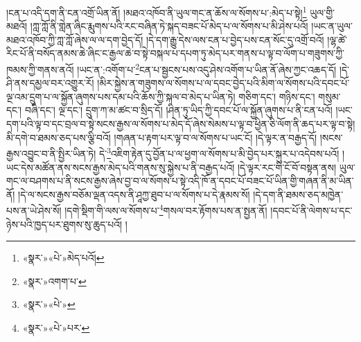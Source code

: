 །ངན་པ་འདི་དག་ནི་ངན་འགྲོ་ཡིན་ནོ། །མཐའ་འཁོབ་ནི་ཡུལ་གང་ན་ཆོས་ལ་སོགས་པ་:མེད་པ་སྟེ།\footnote{«སྣར་»«པེ་»མེད་པའོ།} ཡུལ་གྱི་མཐའོ། །ཀླ་ཀློ་ནི་གླེན་ཞིང་རྨུགས་པའི་རང་བཞིན་ཏེ་སྐད་བཟང་པོ་མེད་པ་ལ་སོགས་པ་མི་ཤེས་པའོ། །ཡང་ན་ཡུལ་མཐའ་འཁོབ་ཀྱི་ཀླ་ཀློ་ཞེས་ལ་ལ་དག་བྱེད་དོ། །དེ་དག་རྒྱུ་དེས་ལས་ངན་པ་བྱེད་པས་ངན་སོང་དུ་འགྲོ་བའོ། །ལྷ་ཚེ་རིང་པོ་ནི་བསོད་ནམས་ཆེ་ཞིང་ང་རྒྱལ་ཆེ་བ་སྟེ་བསྐལ་པ་དཔག་ཏུ་མེད་པར་གནས་པ་ལྟ་བ་ལོག་པ་གཟུགས་ཀྱི་ཁམས་ཀྱི་གནས་ནའོ། །ཡང་ན་:འགོག་པ་\footnote{«སྣར་»འགག་པ་}ངན་པ་སྦྱངས་པས་འདུ་ཤེས་འགོག་པ་ཡིན་ནོ་ཞེས་ཀྱང་འཆད་དོ། །དེ་ཤི་ནས་དམྱལ་བར་འགྱུར་རོ། །མིར་སྐྱེས་ན་གཟུགས་ལ་སོགས་པ་ལ་དབང་བྱེད་པའི་མིག་ལ་སོགས་པའི་དབང་པོ་ལྔ་འམ་དྲུག་པ་ལ་སྐྱོན་ཞུགས་པས་དམ་པའི་ཆོས་ཀྱི་སྐལ་བ་མེད་པ་ཡིན་ཏེ། གཅིག་དང་། གཉིས་དང་། གསུམ་དང་། བཞི་དང་། ལྔ་དང་། དྲུག་ཀ་མ་ཚང་བ་སྲིད་དོ། །ཤིན་ཏུ་ཡིད་ཀྱི་དབང་པོ་ལ་སྐྱོན་ཞུགས་པ་ནི་ངན་པའོ། །ཡང་དག་པའི་ལྟ་བ་དང་བྲལ་བ་སྟེ་སངས་རྒྱས་ལ་སོགས་པ་མེད་དོ་ཞེས་སེམས་པ་ལྟ་བ་ཕྱིན་ཅི་ལོག་ནི་ཆད་པར་ལྟ་བ་སྟེ། མི་དགེ་བ་ཐམས་ཅད་པས་ལྕི་བའོ། །གཞན་པ་རྟག་པར་ལྟ་བ་ལ་སོགས་པ་ཡང་ངོ། །དེ་ལྟར་ན་བརྒྱད་དོ། །སངས་རྒྱས་འབྱུང་བ་ནི་སྤྱིར་ཡིན་ཏེ། དེ་\footnote{«སྣར་»«པེ་»}འཇིག་རྟེན་དུ་བྱོན་པ་ལ་ཕྱག་ལ་སོགས་པ་མི་བྱེད་པར་སྐུར་པ་འདེབས་པའོ། །ཡང་དེས་མཚོན་ནས་སངས་རྒྱས་མེད་པའི་གནས་སུ་སྐྱེས་པ་ནི་བརྒྱད་པའོ། །དེ་ལྟར་རང་གི་ངོ་བོ་བསྟན་ནས། ཡུལ་གང་ལ་བཤགས་པ་ནི་སངས་རྒྱས་ཞེས་བྱ་བ་ལ་སོགས་པ་སྟེ་འདི་ཁོ་ན་དབང་པོ་བཟང་པོ་ཡིན་གྱི་གཞན་ནི་མ་ཡིན་ནོ། །དེ་ལ་སངས་རྒྱས་བཅོམ་ལྡན་འདས་ནི་ཤཱཀྱ་ཐུབ་པ་ལ་སོགས་པ་དེ་རྣམས་སོ། །དེ་དག་ནི་ཐམས་ཅད་མཁྱེན་པས་ན་ཡེ་ཤེས་སོ། །དགེ་སྡིག་གི་ལས་ལ་སོགས་པ་\footnote{«སྣར་»«པེ་»པར་}གསལ་བར་རྟོགས་པས་ན་སྤྱན་ནོ། །དབང་པོ་ནི་ལེགས་པ་དང་ཉེས་པའི་ཁྱད་པར་ཐུགས་སུ་ཆུད་པའོ། །
